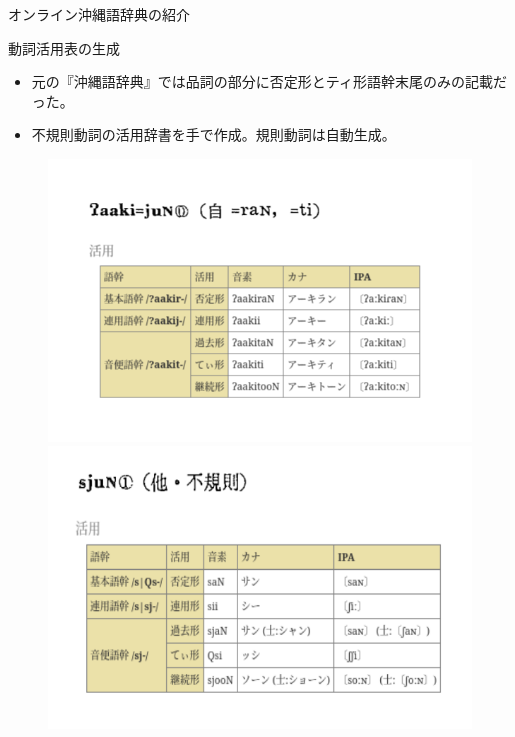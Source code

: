 \documentclass[14pt]{beamer}
\begin{document}
\begin{frame}{オンライン沖縄語辞典の紹介}
  \begin{block}{動詞活用表の生成}
    \begin{itemize}
    \item 元の『沖縄語辞典』では品詞の部分に否定形とティ形語幹末尾のみの記載だった。
    \item 不規則動詞の活用辞書を手で作成。規則動詞は自動生成。
    \end{itemize}
    \begin{figure}[ht]
      \centering
      \begin{minipage}{0.4\paperwidth}
        \includegraphics[height=0.36\paperheight]{verb-conugation-comparison.png}
      \end{minipage}%
      \begin{minipage}{0.4\textwidth}
        \includegraphics[height=0.34\paperheight]{verb-conjugation-comparison-2.png}
      \end{minipage}
    \end{figure}
  \end{block}
\end{frame}
\end{document}
